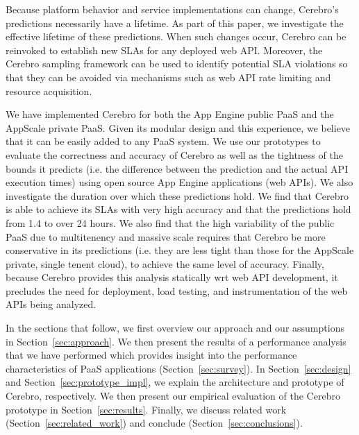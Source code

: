 Because platform behavior and service implementations can change,
Cerebro's predictions necessarily have a lifetime.  
As part of this paper, we investigate
the effective lifetime of these predictions.  When such changes occur,
Cerebro can be reinvoked to establish new SLAs for any deployed web API.  Moreover,
the Cerebro sampling framework can be used to identify potential SLA violations
so that they can be avoided via mechanisms such 
as web API rate limiting and resource acquisition.


We have implemented Cerebro for both the App Engine public PaaS and 
the AppScale private PaaS. Given its modular design and this experience, 
we believe that it can be easily added to any PaaS system.
We use our prototypes to evaluate the correctness and accuracy of Cerebro 
as well as the tightness
of the bounds it predicts (i.e. the difference between the prediction and 
the actual API execution times) using open source App Engine applications (web APIs).  
We also investigate the duration over which 
these predictions hold.  We find that Cerebro is able to achieve its SLAs with 
very high accuracy and that the predictions hold from 1.4 to over 24 hours.  
We also find that the high variability of the public PaaS due to multitenency
and massive scale requires that Cerebro be more conservative in its predictions
(i.e. they are less tight than those for the AppScale private, single tenent cloud), 
to achieve the same level of accuracy.  Finally, because Cerebro provides this 
analysis statically wrt web API development, 
it precludes the need for deployment, load testing, and
instrumentation of the web APIs being analyzed.

In the sections that follow, we first overview our approach and our assumptions 
in Section~\ref{sec:approach}.   We then
present the results of a performance analysis that we have performed which provides
insight into the performance characteristics of PaaS 
applications (Section~\ref{sec:survey}).  
In Section~\ref{sec:design}
and Section~\ref{sec:prototype_impl}, we explain the architecture and 
prototype of Cerebro, respectively.  We then 
present our empirical evaluation of the Cerebro prototype in 
Section~\ref{sec:results}.
Finally,  we discuss related work (Section~\ref{sec:related_work}) and 
conclude (Section~\ref{sec:conclusions}).


